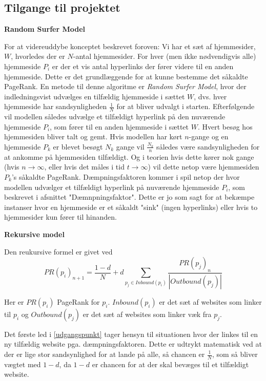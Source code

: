 \subsection*{Tilgange til projektet}

\textbf{Random Surfer Model}


For at videreuddybe konceptet beskrevet foroven: Vi har et sæt af hjemmesider, $W$, hvorledes der er $N$-antal hjemmesider. For hver (men ikke nødvendigvis alle) hjemmeside $P_i$ er der et vis antal hyperlinks der fører videre til en anden hjemmeside. Dette er det grundlæggende for at kunne bestemme det såkaldte PageRank. En metode til denne algoritme er \emph{Random Surfer Model}, hvor der indledningsvist udvælges en tilfældig hjemmeside i sættet $W$, dvs. hver hjemmeside har sandsynligheden $\frac{1}{N}$ for at bliver udvalgt i starten. Efterfølgende vil modellen således udvælge et tilfældigt hyperlink på den nuværende hjemmeside $P_i$, som fører til en anden hjemmeside i sættet $W$. Hvert besøg hos hjemmesiden bliver talt og gemt. Hvis modellen har kørt $n$-gange og en hjemmeside $P_k$ er blevet besøgt $N_k$ gange vil $\frac{N_k}{n}$ således være sandsynligheden for at ankomme på hjemmesiden tilfældigt. Og i teorien hvis dette kører nok gange (hvis $n \rightarrow \infty$, eller hvis det måles i tid $t \rightarrow \infty$) vil dette netop være hjemmesiden $P_k$'s såkaldte PageRank. Dæmpningsfaktoren kommer i spil netop der hvor modellen udvælger et tilfældigt hyperlink på nuværende hjemmeside $P_i$, som beskrevet i afsnittet "Dæmnpningsfaktor". Dette er jo som sagt for at bekæmpe instanser hvor en hjemmeside er et såkaldt "sink" (ingen hyperlinks) eller hvis to hjemmesider kun fører til hinanden.


\textbf{Rekursive model}

Den reukursive formel er givet ved
\begin{equation} \label{udgangspunkt}
    PR(p_i)_{n+1}=\frac{1-d}N+d\sum_{p_j\in Inbound(p_i)}\frac{PR(p_j)_n}{\left|Outbound(p_j)\right|}
\end{equation}

Her er $PR(p_i)$ PageRank for $p_i$. $Inbound(p_i)$ er det sæt af websites som linker til $p_i$ og $Outbound(p_j)$ er det sæt af websites som linker væk fra $p_j$.

Det første led i \eqref{udgangspunkt} tager hensyn til situationen hvor der linkes til en ny tilfældig website pga. dæmpningsfaktoren. Dette er udtrykt matematisk ved at der er lige stor sandsynlighed for at lande på alle, så chancen er $\frac1N$, som så bliver vægtet med $1-d$, da $1-d$ er chancen for at der skal bevæges til et tilfældigt website.

